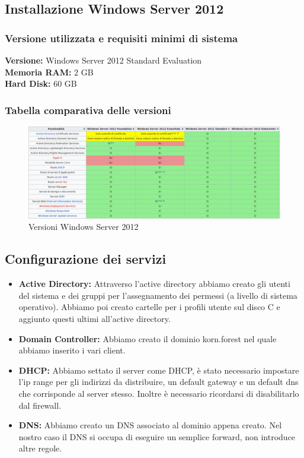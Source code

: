 \documentclass{article}
\begin{document}
\subsection{Installazione Windows Server 2012}
\subsubsection{Versione utilizzata e requisiti minimi di sistema}
\textbf{Versione:} Windows Server 2012 Standard Evaluation\\
\textbf{Memoria RAM:} 2 GB \\
\textbf{Hard Disk:} 60 GB

\subsubsection{Tabella comparativa delle versioni}
\begin{figure}[H]
    \center
    \includegraphics[scale=0.3]{images/tabecomp.png}
    \caption{Versioni Windows Server 2012}\label{fig:1}
\end{figure}

\subsection{Configurazione dei servizi}
\begin{itemize}
    \item \textbf{Active Directory: } Attraverso l'active directory abbiamo creato gli utenti del sistema e dei gruppi per l'assegnamento dei permessi (a livello di sistema operativo). Abbiamo poi creato cartelle per i profili utente sul disco C e aggiunto questi ultimi all'active directory.
    \item \textbf{Domain Controller: } Abbiamo creato il dominio korn.forest nel quale abbiamo inserito i vari client.
    \item \textbf{DHCP: } Abbiamo settato il server come DHCP, è stato necessario impostare l'ip range per gli indirizzi da distribuire, un default gateway e un default dns che corrisponde al server stesso. Inoltre è necessario ricordarsi di disabilitarlo dal firewall.
    \item \textbf{DNS: } Abbiamo creato un DNS associato al dominio appena creato. Nel nostro caso il DNS si occupa di eseguire un semplice forward, non introduce altre regole.
\end{itemize}
\end{document}
